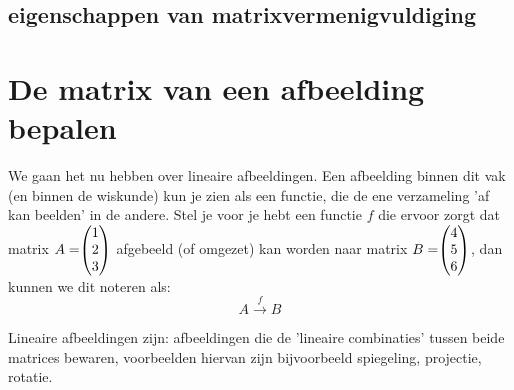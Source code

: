 \subsection{eigenschappen van matrixvermenigvuldiging}

\section{De matrix van een afbeelding bepalen}
We gaan het nu hebben over lineaire afbeeldingen. Een afbeelding binnen dit vak (en binnen de wiskunde) kun je zien als een functie, die de ene verzameling 'af kan beelden' in de andere. Stel je voor je hebt een functie $f$ die ervoor zorgt dat matrix $A = \vecdrie{1}{2}{3} $ afgebeeld (of omgezet) kan worden naar matrix $B = \vecdrie{4}{5}{6} $, dan kunnen we dit noteren als: \[A \xrightarrow{f} B\]

 {Lineaire afbeeldingen zijn: afbeeldingen die de 'lineaire combinaties' tussen beide matrices bewaren, voorbeelden hiervan zijn bijvoorbeeld spiegeling, projectie, rotatie.} 

